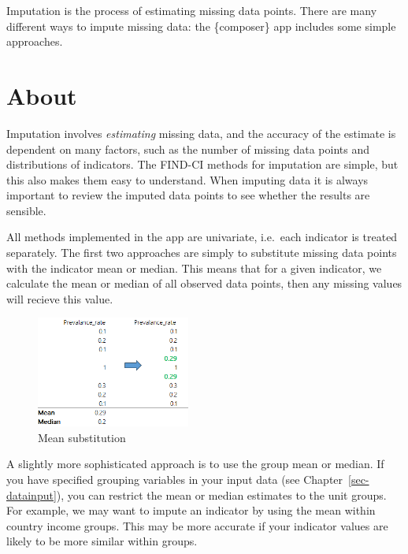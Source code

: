 \documentclass[
  letterpaper,
  DIV=11,
  numbers=noendperiod]{scrreprt}
\begin{document}
Imputation is the process of estimating missing data points. There are
many different ways to impute missing data: the \{composer\} app
includes some simple approaches.

\hypertarget{about-1}{%
\section{About}\label{about-1}}

Imputation involves \emph{estimating} missing data, and the accuracy of
the estimate is dependent on many factors, such as the number of missing
data points and distributions of indicators. The FIND-CI methods for
imputation are simple, but this also makes them easy to understand. When
imputing data it is always important to review the imputed data points
to see whether the results are sensible.

All methods implemented in the app are univariate, i.e.~each indicator
is treated separately. The first two approaches are simply to substitute
missing data points with the indicator mean or median. This means that
for a given indicator, we calculate the mean or median of all observed
data points, then any missing values will recieve this value.

\begin{figure}

{\centering \includegraphics[width=0.45\textwidth,height=\textheight]{figs/imputation_2.png}

}

\caption{Mean substitution}

\end{figure}

A slightly more sophisticated approach is to use the group mean or
median. If you have specified grouping variables in your input data (see
Chapter~\ref{sec-datainput}), you can restrict the mean or median
estimates to the unit groups. For example, we may want to impute an
indicator by using the mean within country income groups. This may be
more accurate if your indicator values are likely to be more similar
within groups.
\end{document}
